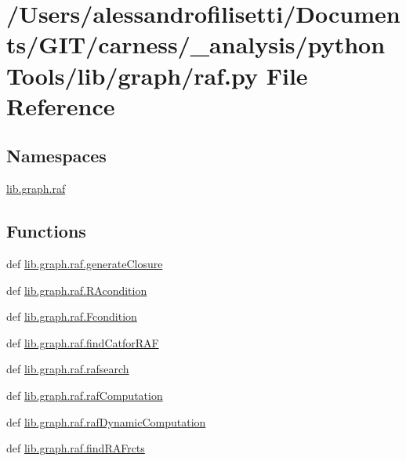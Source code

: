\hypertarget{a00091}{\section{/\+Users/alessandrofilisetti/\+Documents/\+G\+I\+T/carness/\+\_\+analysis/python\+Tools/lib/graph/raf.py File Reference}
\label{a00091}
}
\subsection*{Namespaces}
\begin{DoxyCompactItemize}
\item 
 \hyperlink{a00143}{lib.\+graph.\+raf}
\end{DoxyCompactItemize}
\subsection*{Functions}
\begin{DoxyCompactItemize}
\item 
def \hyperlink{a00143_a56510e9067d8a6c8f90847d6656ce709}{lib.\+graph.\+raf.\+generate\+Closure}
\item 
def \hyperlink{a00143_a9896a4198e08978afb80e86697f1bbd0}{lib.\+graph.\+raf.\+R\+Acondition}
\item 
def \hyperlink{a00143_a160a90fb55ff323fc86fcdc65b30b90f}{lib.\+graph.\+raf.\+Fcondition}
\item 
def \hyperlink{a00143_aaeb3a479f24daf493cc7052aef879d2c}{lib.\+graph.\+raf.\+find\+Catfor\+R\+A\+F}
\item 
def \hyperlink{a00143_a532a434a0b2fe187a3ff5a8319e4e3b4}{lib.\+graph.\+raf.\+rafsearch}
\item 
def \hyperlink{a00143_a3c9606e9d3274506955225eacf05877e}{lib.\+graph.\+raf.\+raf\+Computation}
\item 
def \hyperlink{a00143_a0b49d65e78e62c4ddd5022d4405f8286}{lib.\+graph.\+raf.\+raf\+Dynamic\+Computation}
\item 
def \hyperlink{a00143_aa4fb376eecb97a88efdb35aa15466c3b}{lib.\+graph.\+raf.\+find\+R\+A\+Frcts}
\end{DoxyCompactItemize}
